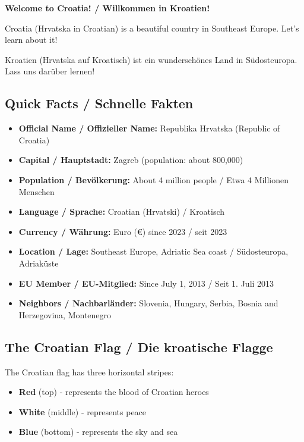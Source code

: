 \begin{culture}
\textbf{Welcome to Croatia! / Willkommen in Kroatien!}

Croatia (Hrvatska in Croatian) is a beautiful country in Southeast Europe. Let's learn about it!

Kroatien (Hrvatska auf Kroatisch) ist ein wunderschönes Land in Südosteuropa. Lass uns darüber lernen!

\subsection*{Quick Facts / Schnelle Fakten}

\begin{itemize}
    \item \textbf{Official Name / Offizieller Name:} Republika Hrvatska (Republic of Croatia)
    \item \textbf{Capital / Hauptstadt:} Zagreb (population: about 800,000)
    \item \textbf{Population / Bevölkerung:} About 4 million people / Etwa 4 Millionen Menschen
    \item \textbf{Language / Sprache:} Croatian (Hrvatski) / Kroatisch
    \item \textbf{Currency / Währung:} Euro (€) since 2023 / seit 2023
    \item \textbf{Location / Lage:} Southeast Europe, Adriatic Sea coast / Südosteuropa, Adriaküste
    \item \textbf{EU Member / EU-Mitglied:} Since July 1, 2013 / Seit 1. Juli 2013
    \item \textbf{Neighbors / Nachbarländer:} Slovenia, Hungary, Serbia, Bosnia and Herzegovina, Montenegro
\end{itemize}

\subsection*{The Croatian Flag / Die kroatische Flagge}

The Croatian flag has three horizontal stripes:
\begin{itemize}
    \item \textcolor{croatianred}{\textbf{Red}} (top) - represents the blood of Croatian heroes
    \item \textbf{White} (middle) - represents peace
    \item \textcolor{croatianblue}{\textbf{Blue}} (bottom) - represents the sky and sea
\end{itemize}


\end{culture}
